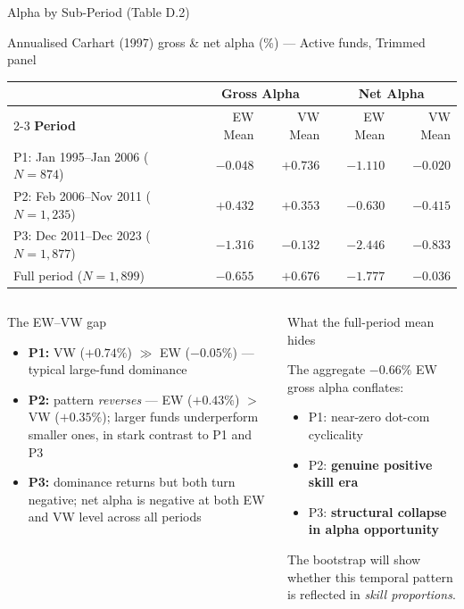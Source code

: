 \documentclass[aspectratio=169,10pt]{beamer}
\newcommand{\red}[1]{\textcolor{AlertRed}{\textbf{#1}}}
\newcommand{\green}[1]{\textcolor{SkillGreen}{\textbf{#1}}}
\begin{document}
\begin{frame}{Alpha by Sub-Period (Table D.2)}
\begin{center}
{\small Annualised Carhart (1997) gross \& net alpha (\%) — Active funds, Trimmed panel}
\vspace{4pt}

\setlength{\tabcolsep}{7pt}
\begin{tabular}{lrr rr}
\toprule
& \multicolumn{2}{c}{\textbf{Gross Alpha}} & \multicolumn{2}{c}{\textbf{Net Alpha}}\\
\cmidrule{2-3}\cmidrule{4-5}
\textbf{Period} & EW Mean & VW Mean & EW Mean & VW Mean\\
\midrule
P1: Jan 1995–Jan 2006 ($N=874$)  & $-0.048$ & $+0.736$ & $-1.110$ & $-0.020$ \\
\rowcolor{SkillGreen!10}
P2: Feb 2006–Nov 2011 ($N=1{,}235$) & $\mathbf{+0.432}$ & $\mathbf{+0.353}$ & $-0.630$ & $-0.415$ \\
\rowcolor{AlertRed!10}
P3: Dec 2011–Dec 2023 ($N=1{,}877$) & $\mathbf{-1.316}$ & $\mathbf{-0.132}$ & $-2.446$ & $-0.833$ \\
\midrule
Full period ($N=1{,}899$) & $-0.655$ & $+0.676$ & $-1.777$ & $-0.036$ \\
\bottomrule
\end{tabular}
\end{center}
\vspace{4pt}
\begin{columns}[T]
\begin{block}{The EW--VW gap}
{\scriptsize
\begin{itemize}
  \item \textbf{P1:} VW ($+0.74\%$) $\gg$ EW ($-0.05\%$) — typical large-fund dominance
  \item \textbf{P2:} pattern \emph{reverses} — EW ($+0.43\%$) $>$ VW ($+0.35\%$); larger funds underperform smaller ones, in stark contrast to P1 and P3
  \item \textbf{P3:} dominance returns but both turn negative; net alpha is negative at both EW and VW level across all periods
\end{itemize}}
\end{block}

\begin{block}{What the full-period mean hides}
{\footnotesize The aggregate $-0.66\%$ EW gross alpha conflates:
\begin{itemize}
  \item P1: near-zero dot-com cyclicality
  \item P2: \green{genuine positive skill era}
  \item P3: \red{structural collapse in alpha opportunity}
\end{itemize}
The bootstrap will show whether this temporal pattern is reflected in \emph{skill proportions}.}
\end{block}
\end{columns}
\end{frame}
\end{document}
